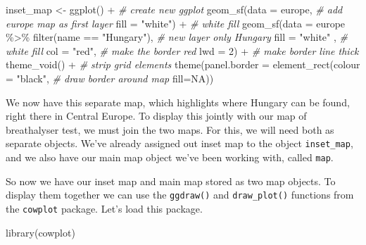 \documentclass[
  krantz2]{krantz}
\makeatletter
\newenvironment{Shaded}{\begin{snugshade}}{\end{snugshade}}
\newcommand{\AttributeTok}[1]{\textcolor[rgb]{0.61,0.61,0.61}{#1}}
\newcommand{\CommentTok}[1]{\textcolor[rgb]{0.37,0.37,0.37}{\textit{#1}}}
\newcommand{\ConstantTok}[1]{\textcolor[rgb]{0,0,0}{#1}}
\newcommand{\DecValTok}[1]{\textcolor[rgb]{0.06,0.06,0.06}{#1}}
\newcommand{\FunctionTok}[1]{\textcolor[rgb]{0,0,0}{#1}}
\newcommand{\NormalTok}[1]{#1}
\newcommand{\OtherTok}[1]{\textcolor[rgb]{0.37,0.37,0.37}{#1}}
\newcommand{\SpecialCharTok}[1]{\textcolor[rgb]{0,0,0}{#1}}
\newcommand{\StringTok}[1]{\textcolor[rgb]{0.5,0.5,0.5}{#1}}
\newenvironment{kframe}{%
\medskip{}
\setlength{\fboxsep}{.8em}
 \def\at@end@of@kframe{}%
 \ifinner\ifhmode%
  \def\at@end@of@kframe{\end{minipage}}%
  \begin{minipage}{\columnwidth}%
 \fi\fi%
 \def\FrameCommand##1{\hskip\@totalleftmargin \hskip-\fboxsep
 \colorbox{shadecolor}{##1}\hskip-\fboxsep
     \hskip-\linewidth \hskip-\@totalleftmargin \hskip\columnwidth}%
 \MakeFramed {\advance\hsize-\width
   \@totalleftmargin\z@ \linewidth\hsize
   \@setminipage}}%
 {\par\unskip\endMakeFramed%
 \at@end@of@kframe}
\renewenvironment{Shaded}{\begin{kframe}}{\end{kframe}}
\makeatother
\begin{document}
\begin{Shaded}
\begin{Highlighting}[]
\NormalTok{inset\_map }\OtherTok{\textless{}{-}} \FunctionTok{ggplot}\NormalTok{() }\SpecialCharTok{+}  \CommentTok{\# create new ggplot }
  \FunctionTok{geom\_sf}\NormalTok{(}\AttributeTok{data =}\NormalTok{ europe,  }\CommentTok{\# add europe map as first layer}
          \AttributeTok{fill =} \StringTok{"white"}\NormalTok{) }\SpecialCharTok{+} \CommentTok{\# white fill }
  \FunctionTok{geom\_sf}\NormalTok{(}\AttributeTok{data =}\NormalTok{ europe }\SpecialCharTok{\%\textgreater{}\%} \FunctionTok{filter}\NormalTok{(name }\SpecialCharTok{==} \StringTok{"Hungary"}\NormalTok{), }\CommentTok{\# new layer only Hungary}
          \AttributeTok{fill =} \StringTok{"white"}\NormalTok{ ,  }\CommentTok{\# white fill}
          \AttributeTok{col =} \StringTok{"red"}\NormalTok{,   }\CommentTok{\# make the border red}
          \AttributeTok{lwd =} \DecValTok{2}\NormalTok{) }\SpecialCharTok{+}   \CommentTok{\# make border line thick}
  \FunctionTok{theme\_void}\NormalTok{() }\SpecialCharTok{+}  \CommentTok{\# strip grid elements}
  \FunctionTok{theme}\NormalTok{(}\AttributeTok{panel.border =} \FunctionTok{element\_rect}\NormalTok{(}\AttributeTok{colour =} \StringTok{"black"}\NormalTok{, }\CommentTok{\# draw border around map}
                                    \AttributeTok{fill=}\ConstantTok{NA}\NormalTok{)) }
\end{Highlighting}
\end{Shaded}

We now have this separate map, which highlights where Hungary can be found, right there in Central Europe. To display this jointly with our map of breathalyser test, we must join the two maps. For this, we will need both as separate objects. We've already assigned out inset map to the object \texttt{inset\_map}, and we also have our main map object we've been working with, called \texttt{map}.

So now we have our inset map and main map stored as two map objects. To display them together we can use the \texttt{ggdraw()} and \texttt{draw\_plot()} functions from the \texttt{cowplot} package. Let's load this package.

\begin{Shaded}
\begin{Highlighting}[]
\FunctionTok{library}\NormalTok{(cowplot)}
\end{Highlighting}
\end{Shaded}
\end{document}
